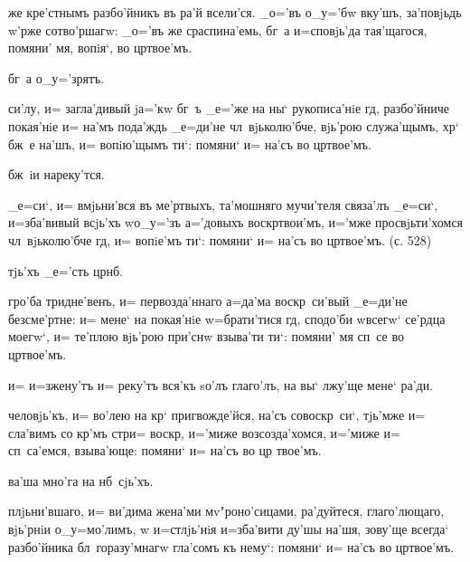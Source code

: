 
же кре'стнымъ разбо'йникъ въ ра'й всели'ся. _о='въ 
о_у='бw вку'шъ, за'повjьдь w'рже сотво'ршагw: _о='въ 
же сраспина'емь, бг~а и=сповjь'да тая'щагося, помяни' мя, 
вопiя`, во цр твое'мъ.

бг~а о_у='зрятъ.

си'лу, и= загла'дивый jа='кw бг~ъ _е='же на ны` 
рукописа'нiе гд, разбо'йниче покая'нiе и= на'мъ 
пода'ждь _е=ди'не чл~вjьколю'бче, вjь'рою служа'щымъ, 
хр` бж~е на'шъ, и= вопiю'щымъ ти`: помяни` и= на'съ 
во цр твое'мъ.

бж~iи нареку'тся.

_е=си`, и= вмjьни'вся въ ме'ртвыхъ, та'мошняго мучи'теля 
связа'лъ _е=си`, и=зба'вивый всjь'хъ w\т о_у='зъ 
а='довыхъ воскр твои'мъ, и='мже просвjьти'хомся 
чл~вjьколю'бче гд, и= вопiе'мъ ти`: помяни` и= на'съ 
во цр твое'мъ. (с. 528)

тjь'хъ _е='сть цр нб.

гро'ба тридне'венъ, и= первозда'ннаго а=да'ма 
воскр~си'вый _е=ди'не безсме'ртне: и= мене` на покая'нiе 
w=брати'тися гд, сподо'би w\т всегw` се'рдца моегw`, 
и= те'плою вjь'рою при'снw взыва'ти ти`: помяни' мя сп~се 
во цр твое'мъ.

и= и=зжену'тъ и= реку'тъ вся'къ sо'лъ глаго'лъ, на вы` 
лжу'ще мене` ра'ди.

человjь'къ, и= во'лею на кр` пригвожде'йся, на'съ 
совоскр~си`, тjь'мже и= сла'вимъ со кр'мъ стр и= 
воскр, и='миже возсозда'хомся, и='миже и= 
сп~са'емся, взыва'юще: помяни` и= на'съ во цр 
твое'мъ.

ва'ша мно'га на нб~сjь'хъ.

плjьни'вшаго, и= ви'дима жена'ми мv"роно'сицами, 
ра'дуйтеся, глаго'лющаго, вjь'рнiи о_у=мо'лимъ, w\т 
и=стлjь'нiя и=зба'вити ду'шы на'шя, зову'ще всегда` 
разбо'йника бл~горазу'мнагw гла'сомъ къ нему`: помяни` и= 
на'съ во цр твое'мъ.

